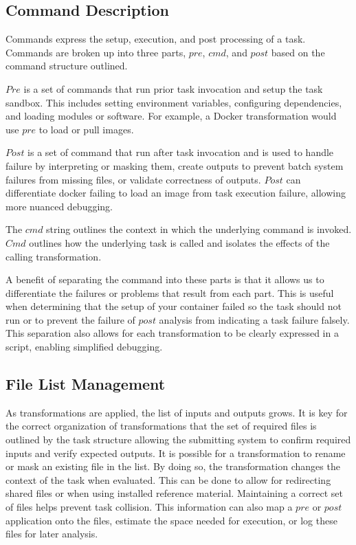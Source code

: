 \documentclass[conference]{IEEEtran}
\begin{document}
\subsection{Command Description}

Commands express the setup, execution, and post processing
of a task. 
Commands are broken up into three parts, 
${pre}$, ${cmd}$, and ${post}$
based on the command structure outlined.

${Pre}$ is a set of commands that run prior task invocation
and setup the task sandbox. 
This includes setting environment variables, 
configuring dependencies, and loading modules or software.
For example, a Docker transformation would use ${pre}$ to load or pull images. 

${Post}$ is a set of command that run after task invocation
and is used to 
handle failure by interpreting or masking them,
create outputs to prevent batch system failures from missing files,
or validate correctness of outputs. 
${Post}$ can differentiate 
docker failing to load an image from
task execution failure, 
allowing more nuanced debugging. 

The ${cmd}$ string outlines the context in which
the underlying command is invoked.
${Cmd}$ outlines how the underlying task is called
and isolates the effects of the calling transformation.

A benefit of separating the command into these parts
is that it allows us to differentiate the failures or 
problems that result from each part.
This is useful when determining that the setup of 
your container failed so the task should not run 
or to prevent the failure of $post$ analysis from 
indicating a task failure falsely.
This separation also allows for each transformation
to be clearly expressed in a script, 
enabling simplified debugging.



\subsection{File List Management}

As transformations are applied, the list of inputs and outputs grows. 
It is key for the correct organization of transformations that the 
set of required files is outlined by the task structure
allowing the submitting system to confirm required inputs
and verify expected outputs.
It is possible for a transformation to rename or mask an existing 
file in the list.
By doing so, the transformation changes the 
context of the task when evaluated.
This can be done to allow for redirecting shared files or when using
installed reference material.
Maintaining a correct set of files helps
prevent task collision.
This information can also map a
$pre$ or $post$ application onto the files, 
estimate the space needed for execution,
or log these files for later analysis.
\end{document}
